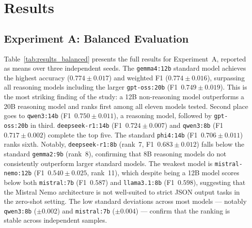 \documentclass[journal]{IEEEtran}
\begin{document}
\section{Results}
\label{sec:results}

\subsection{Experiment A: Balanced Evaluation}

Table~\ref{tab:results_balanced} presents the full results for
Experiment~A, reported as means over three independent seeds.
The \texttt{gemma4:12b} standard model achieves the
highest accuracy ($0.774 \pm 0.017$) and weighted F1 ($0.774 \pm 0.016$),
surpassing all reasoning models including the larger
\texttt{gpt-oss:20b} (F1~$0.749 \pm 0.019$). This is the most striking
finding of the study: a 12B non-reasoning model outperforms a 20B
reasoning model and ranks first among all eleven models tested.
Second place goes to \texttt{qwen3:14b} (F1~$0.750 \pm 0.011$),
a reasoning model, followed by \texttt{gpt-oss:20b} in third.
\texttt{deepseek-r1:14b} (F1~$0.724 \pm 0.007$) and
\texttt{qwen3:8b} (F1~$0.717 \pm 0.002$) complete the top five.
The standard \texttt{phi4:14b} (F1~$0.706 \pm 0.011$) ranks sixth.
Notably, \texttt{deepseek-r1:8b} (rank~7, F1~$0.683 \pm 0.012$)
falls below the standard \texttt{gemma2:9b} (rank~8), confirming
that 8B reasoning models do not consistently outperform larger
standard models. The weakest model is \texttt{mistral-nemo:12b}
(F1~$0.540 \pm 0.025$, rank~11), which despite being a 12B model
scores below both \texttt{mistral:7b} (F1~$0.587$) and
\texttt{llama3.1:8b} (F1~$0.598$), suggesting that the Mistral Nemo
architecture is not well-suited to strict JSON output tasks in the zero-shot
setting. The low standard deviations across most models —
notably \texttt{qwen3:8b} ($\pm$0.002) and \texttt{mistral:7b}
($\pm$0.004) — confirm that the ranking is stable across independent
samples.
\end{document}
